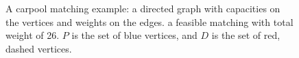 \begin{figure}[h]
\centering

\caption[]{
\label{fig:carpool}
A carpool matching example: 
a directed graph with capacities on the vertices and weights on the edges. 
a feasible matching with total weight of 26.
$P$ is the set of blue vertices, and $D$ is the set of red, dashed vertices. 
}
\end{figure}  
